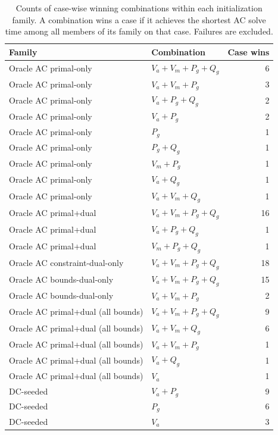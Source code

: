 \begin{table}[!t]
\centering
\caption{Counts of case-wise winning combinations within each initialization family. A combination wins a case if it achieves the shortest AC solve time among all members of its family on that case. Failures are excluded.}
\label{tab:combo_wins}
\small
\begin{tabular}{llr}
\toprule
Family & Combination & Case wins \\
\midrule
Oracle AC primal-only & $V_a{+}V_m{+}P_g{+}Q_g$ & 6 \\
Oracle AC primal-only & $V_a{+}V_m{+}P_g$ & 3 \\
Oracle AC primal-only & $V_a{+}P_g{+}Q_g$ & 2 \\
Oracle AC primal-only & $V_a{+}P_g$ & 2 \\
Oracle AC primal-only & $P_g$ & 1 \\
Oracle AC primal-only & $P_g{+}Q_g$ & 1 \\
Oracle AC primal-only & $V_m{+}P_g$ & 1 \\
Oracle AC primal-only & $V_a{+}Q_g$ & 1 \\
Oracle AC primal-only & $V_a{+}V_m{+}Q_g$ & 1 \\
\midrule
Oracle AC primal+dual & $V_a{+}V_m{+}P_g{+}Q_g$ & 16 \\
Oracle AC primal+dual & $V_a{+}P_g{+}Q_g$ & 1 \\
Oracle AC primal+dual & $V_m{+}P_g{+}Q_g$ & 1 \\
\midrule
Oracle AC constraint-dual-only & $V_a{+}V_m{+}P_g{+}Q_g$ & 18 \\
\midrule
Oracle AC bounds-dual-only & $V_a{+}V_m{+}P_g{+}Q_g$ & 15 \\
Oracle AC bounds-dual-only & $V_a{+}V_m{+}P_g$ & 2 \\
\midrule
Oracle AC primal+dual (all bounds) & $V_a{+}V_m{+}P_g{+}Q_g$ & 9 \\
Oracle AC primal+dual (all bounds) & $V_a{+}V_m{+}Q_g$ & 6 \\
Oracle AC primal+dual (all bounds) & $V_a{+}V_m{+}P_g$ & 1 \\
Oracle AC primal+dual (all bounds) & $V_a{+}Q_g$ & 1 \\
Oracle AC primal+dual (all bounds) & $V_a$ & 1 \\
\midrule
DC-seeded & $V_a{+}P_g$ & 9 \\
DC-seeded & $P_g$ & 6 \\
DC-seeded & $V_a$ & 3 \\
\bottomrule
\end{tabular}
\end{table}